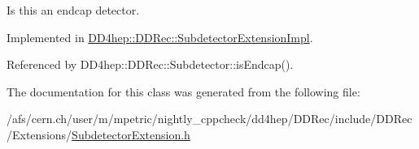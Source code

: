 Is this an endcap detector. 

Implemented in \hyperlink{class_d_d4hep_1_1_d_d_rec_1_1_subdetector_extension_impl_a2f282d14ec8c7f72fe996722df3fb66f}{DD4hep::DDRec::SubdetectorExtensionImpl}.

Referenced by DD4hep::DDRec::Subdetector::isEndcap().

The documentation for this class was generated from the following file:\begin{DoxyCompactItemize}
\item 
/afs/cern.ch/user/m/mpetric/nightly\_\-cppcheck/dd4hep/DDRec/include/DDRec/Extensions/\hyperlink{_subdetector_extension_8h}{SubdetectorExtension.h}\end{DoxyCompactItemize}
